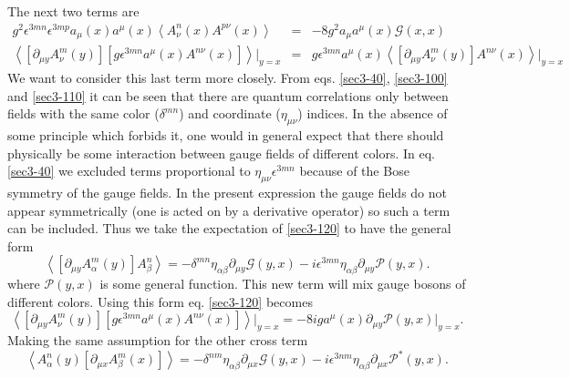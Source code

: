 \documentclass[a4paper,aps,showpacs]{revtex4}
\begin{document}
The next two terms are
\begin{eqnarray}
 g^2  \epsilon^{3mn} \epsilon^{3mp} a_\mu (x) a^\mu (x)
  \left\langle
  A^n_\nu (x) A^{p \nu} (x)
  \right\rangle & = & 
  -8 g^2 a_\mu a^\mu (x) \mathcal G (x,x)
\label{sec3-110}\\
  \left\langle
    \left[
    \partial_{\mu y} A^m_\nu (y) 
    \right]
    \left[
    g \epsilon^{3mn} a^\mu (x)
    A^{n \nu}(x)
    \right]
  \right\rangle \Bigr |_{y=x} & = & 
  g \epsilon^{3mn} a^\mu (x)
  \left\langle
    \left[
    \partial_{\mu y} A^m_\nu (y)
    \right]
  A^{n \nu}(x)
  \right\rangle \Bigr |_{y=x} 
\label{sec3-120}
\end{eqnarray}
We want to consider this last term more closely. From 
eqs. \eqref{sec3-40}, \eqref{sec3-100} and \eqref{sec3-110} 
it can be seen that there are quantum 
correlations only between fields with the same color ($\delta^{mn}$) and 
coordinate ($\eta_{\mu \nu}$) indices. In the absence of some principle
which forbids it, one would in general expect that there should physically be some
interaction between gauge fields of different colors. In eq. \eqref{sec3-40} we
excluded terms proportional to $\eta _{\mu \nu} \epsilon^{3mn}$ because of
the Bose symmetry of the gauge fields. In the present expression the
gauge fields do not appear symmetrically (one is acted on by a derivative operator)
so such a term can be included. Thus we take the expectation of \eqref{sec3-120}
to have the general form
\begin{equation}
  \left\langle
    \left[
    \partial_{\mu y} A^m_\alpha (y) 
    \right]
  A^n_\beta
  \right\rangle = 
  - \delta^{mn} \eta_{\alpha \beta} \partial_{\mu y} 
  \mathcal G (y,x) - i \epsilon^{3mn} \eta_{\alpha \beta}
  \partial_{\mu y} \mathcal P (y,x)  .
\label{sec3-130}
\end{equation}
where $\mathcal P (y,x)$ is some general function. This new term will
mix gauge bosons of different colors. Using this form eq. \eqref{sec3-120}
becomes
\begin{equation}
  \left\langle 
    \left[
    \partial_{\mu y} A^m_\nu (y) 
    \right]
    \left[
    g \epsilon^{3mn} a^\mu (x)
    A^{n \nu}(x)
    \right]
  \right\rangle \Bigr |_{y=x}  = 
  - 8 i g a^\mu(x) \partial_{\mu y} \mathcal P (y,x) \Bigr |_{y=x} .
\label{sec3-150}
\end{equation}
Making the same assumption for the other cross term 
\begin{equation}
  \left\langle
  A^n_\alpha (y) 
    \left[
    \partial_{\mu x} A^m_\beta (x)
    \right]
  \right\rangle = 
  -\delta^{nm} \eta_{\alpha \beta} \partial_{\mu x} \mathcal G (y,x) - 
  i \epsilon^{3nm} \eta_{\alpha \beta} \partial_{\mu x} \mathcal P^* (y,x) .
\label{sec3-160}
\end{equation}
\end{document}
